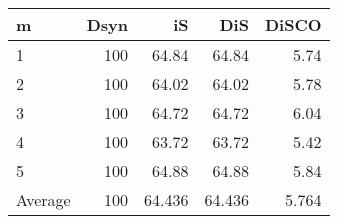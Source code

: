 \begin{tabular}{lrrrr}
  \toprule
m & Dsyn & iS & DiS & DiSCO \\ 
  \midrule
1 & 100 & 64.84 & 64.84 & 5.74 \\ 
  2 & 100 & 64.02 & 64.02 & 5.78 \\ 
  3 & 100 & 64.72 & 64.72 & 6.04 \\ 
  4 & 100 & 63.72 & 63.72 & 5.42 \\ 
  5 & 100 & 64.88 & 64.88 & 5.84 \\ 
  Average & 100 & 64.436 & 64.436 & 5.764 \\ 
   \bottomrule
\end{tabular}
